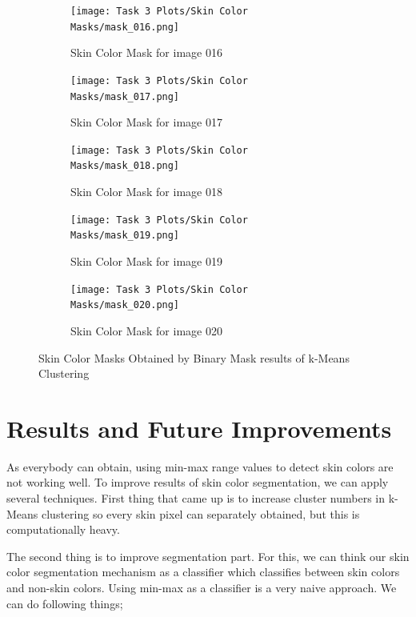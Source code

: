 \documentclass[11pt]{report}
\begin{document}
\begin{figure}[H]
\begin{subfigure}{0.24\textwidth}
        \label{fig:kskincolormask15}
    \end{subfigure}
    \begin{subfigure}{0.24\textwidth}
        \centering
        \texttt{[image: Task 3 Plots/Skin Color Masks/mask\_016.png]}
        \caption{Skin Color Mask for image 016}
        \label{fig:kskincolormask16}
    \end{subfigure}
    \begin{subfigure}{0.24\textwidth}
        \centering
        \texttt{[image: Task 3 Plots/Skin Color Masks/mask\_017.png]}
        \caption{Skin Color Mask for image 017}
        \label{fig:kskincolormask17}
    \end{subfigure}
    \begin{subfigure}{0.24\textwidth}
        \centering
        \texttt{[image: Task 3 Plots/Skin Color Masks/mask\_018.png]}
        \caption{Skin Color Mask for image 018}
        \label{fig:kskincolormask18}
    \end{subfigure}
    \begin{subfigure}{0.24\textwidth}
        \centering
        \texttt{[image: Task 3 Plots/Skin Color Masks/mask\_019.png]}
        \caption{Skin Color Mask for image 019}
        \label{fig:kskincolormask19}
    \end{subfigure}
    \begin{subfigure}{0.24\textwidth}
        \centering
        \texttt{[image: Task 3 Plots/Skin Color Masks/mask\_020.png]}
        \caption{Skin Color Mask for image 020}
        \label{fig:kskincolormask20}
    \end{subfigure}
    \caption{Skin Color Masks Obtained by Binary Mask results of k-Means Clustering}
    \label{fig:ksincolormaskall}
\end{figure}

\section{Results and Future Improvements}

As everybody can obtain, using min-max range values to detect skin colors are not working well. To improve results of skin color segmentation, we can apply several techniques. First thing that came up is to increase cluster numbers in k-Means clustering so every skin pixel can separately obtained, but this is computationally heavy.

The second thing is to improve segmentation part. For this, we can think our skin color segmentation mechanism as a classifier which classifies between skin colors and non-skin colors. Using min-max as a classifier is a very naive approach. We can do following things;
\end{document}
